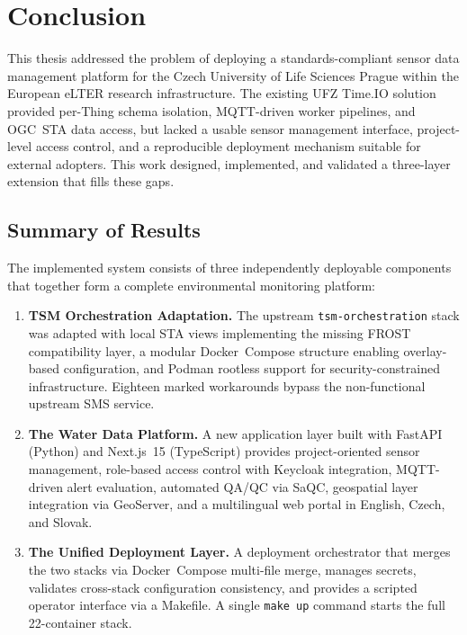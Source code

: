 \chapter{Conclusion}
\label{chap:conclusion}

This thesis addressed the problem of deploying a standards-compliant sensor data
management platform for the Czech University of Life Sciences Prague within the European
eLTER research infrastructure. The existing UFZ Time.IO solution provided per-Thing
schema isolation, MQTT-driven worker pipelines, and OGC~STA data access, but lacked a
usable sensor management interface, project-level access control, and a reproducible
deployment mechanism suitable for external adopters. This work designed, implemented,
and validated a three-layer extension that fills these gaps.

\section*{Summary of Results}

The implemented system consists of three independently deployable components that together
form a complete environmental monitoring platform:

\begin{enumerate}
  \item \textbf{TSM Orchestration Adaptation.}
        The upstream \texttt{tsm-orchestration} stack was adapted with local STA views
        implementing the missing FROST compatibility layer, a modular Docker~Compose
        structure enabling overlay-based configuration, and Podman rootless support for
        security-constrained infrastructure. Eighteen marked workarounds bypass the
        non-functional upstream SMS service.

  \item \textbf{The Water Data Platform.}
        A new application layer built with FastAPI (Python) and Next.js~15 (TypeScript)
        provides project-oriented sensor management, role-based access control with
        Keycloak integration, MQTT-driven alert evaluation, automated QA/QC via SaQC,
        geospatial layer integration via GeoServer, and a multilingual web portal in
        English, Czech, and Slovak.

  \item \textbf{The Unified Deployment Layer.}
        A deployment orchestrator that merges the two stacks via Docker~Compose
        multi-file merge, manages secrets, validates cross-stack configuration
        consistency, and provides a scripted operator interface via a Makefile.
        A single \texttt{make up} command starts the full 22-container stack.
\end{enumerate}

